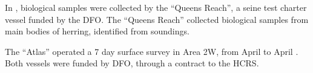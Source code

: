 In \thisYr{}, biological samples were collected by the ``Queens Reach'', a seine test charter vessel funded by the DFO.
The ``Queens Reach'' collected biological samples from main bodies of herring, identified from soundings.
 
The ``Atlas'' operated a 7 day surface survey in Area 2W, from April  to April .
Both vessels were funded by DFO, through a contract to the HCRS.